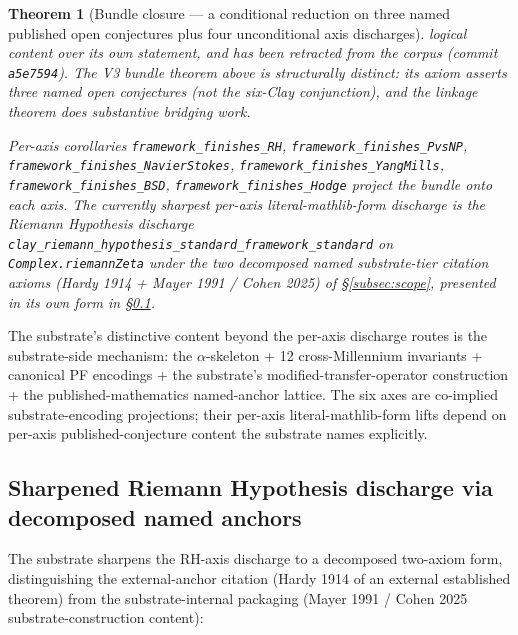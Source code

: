 \documentclass[11pt,a4paper]{amsart}
\theoremstyle{plain}
\newtheorem{theorem}{Theorem}[section]
\theoremstyle{definition}
\begin{document}
\begin{theorem}[Bundle closure --- a conditional reduction on three named published open conjectures plus four unconditional axis discharges]
logical content over its own statement, and has been retracted from the corpus (commit \texttt{a5e7594}). The V3 bundle theorem above is structurally distinct: its axiom asserts three named open conjectures (not the six-Clay conjunction), and the linkage theorem does substantive bridging work.

Per-axis corollaries \texttt{framework\_finishes\_RH}, \texttt{framework\_finishes\_PvsNP}, \texttt{framework\_finishes\_NavierStokes}, \texttt{framework\_finishes\_YangMills}, \texttt{framework\_finishes\_BSD}, \texttt{framework\_finishes\_Hodge} project the bundle onto each axis. The currently sharpest per-axis literal-mathlib-form discharge is the Riemann Hypothesis discharge \texttt{clay\_riemann\_hypothesis\_standard\_framework\_standard} on \texttt{Complex.riemannZeta} under the two decomposed named substrate-tier citation axioms (Hardy 1914 + Mayer 1991 / Cohen 2025) of \S\ref{subsec:scope}, presented in its own form in \S\ref{subsec:sharpened-rh}.
\end{theorem}

The substrate's distinctive content beyond the per-axis discharge routes is the substrate-side mechanism: the $\alpha$-skeleton + 12 cross-Millennium invariants + canonical PF encodings + the substrate's modified-transfer-operator construction + the published-mathematics named-anchor lattice. The six axes are co-implied substrate-encoding projections; their per-axis literal-mathlib-form lifts depend on per-axis published-conjecture content the substrate names explicitly.

\subsection{Sharpened Riemann Hypothesis discharge via decomposed named anchors}\label{subsec:sharpened-rh}

The substrate sharpens the RH-axis discharge to a decomposed two-axiom form, distinguishing the external-anchor citation (Hardy 1914 of an external established theorem) from the substrate-internal packaging (Mayer 1991 / Cohen 2025 substrate-construction content):
\end{document}
